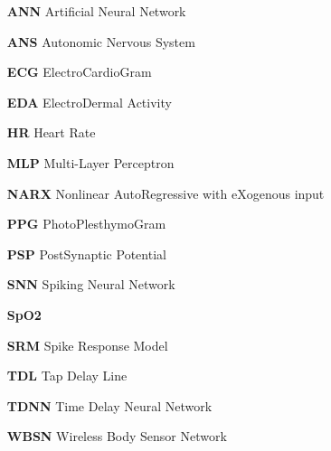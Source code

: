  
\begin{itemize} 

\item[\textbf{ANN}] Artificial Neural Network
\item[\textbf{ANS}] Autonomic Nervous System
\item[\textbf{ECG}] ElectroCardioGram
\item[\textbf{EDA}] ElectroDermal Activity
\item[\textbf{HR}] Heart Rate
\item[\textbf{MLP}] Multi-Layer Perceptron
\item[\textbf{NARX}] Nonlinear AutoRegressive with eXogenous input
\item[\textbf{PPG}] PhotoPlesthymoGram
\item[\textbf{PSP}] PostSynaptic Potential
\item[\textbf{SNN}] Spiking Neural Network
\item[\textbf{SpO2}] 
\item[\textbf{SRM}] Spike Response Model
\item[\textbf{TDL}] Tap Delay Line
\item[\textbf{TDNN}] Time Delay Neural Network
\item[\textbf{WBSN}] Wireless Body Sensor Network

\end{itemize} 

